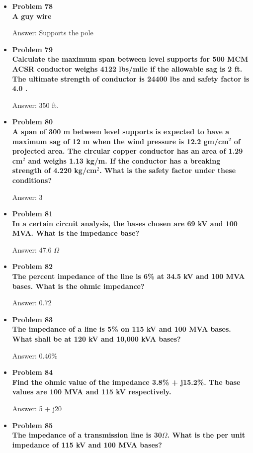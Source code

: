 \documentclass{article}
\begin{document}
\begin{center}
\begin{itemize}
    \item\textbf{Problem 78\\%
    A guy wire}

    Answer: Supports the pole

    \item\textbf{Problem 79\\%
    Calculate the maximum span between level supports for 500 MCM ACSR conductor weighs 4122 lbs/mile if the allowable sag is 2 ft. The ultimate strength of conductor is 24400 lbs and safety factor is 4.0 .}

    Answer: 350 ft.

    \item\textbf{Problem 80\\%
    A span of 300 m between level supports is expected to have a maximum sag of 12 m when the wind pressure is 12.2 gm/cm$^2$ of projected area. The circular copper conductor has an area of 1.29 cm$^2$ and weighs 1.13 kg/m. If the conductor has a breaking strength of 4.220 kg/cm$^2$. What is the safety factor under these conditions?}

    Answer: 3

    \item\textbf{Problem 81\\%
    In a certain circuit analysis, the bases chosen are 69 kV and 100 MVA. What is the impedance base?}

    Answer: 47.6 $\Omega$

    \item\textbf{Problem 82\\%
    The percent impedance of the line is 6\% at 34.5 kV and 100 MVA bases. What is the ohmic impedance?}

    Answer: 0.72

    \item\textbf{Problem 83\\%
    The impedance of a line is 5\% on 115 kV and 100 MVA bases. What shall be at 120 kV and 10,000 kVA bases?}

    Answer: 0.46\%

    \item\textbf{Problem 84\\%
    Find the ohmic value of the impedance 3.8\% + j15.2\%. The base values are 100 MVA and 115 kV respectively.}

    Answer: 5 + j20

    \item\textbf{Problem 85\\%
    The impedance of a transmission line is 30$\Omega$. What is the per unit impedance of 115 kV and 100 MVA bases?}


\end{itemize}
\end{center}
\end{document}
